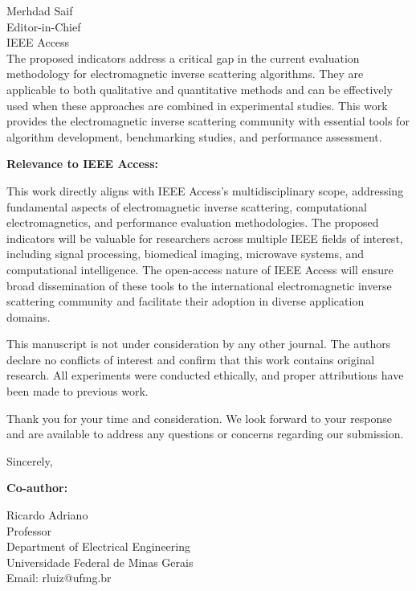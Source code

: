 \documentclass[11pt]{letter}
\begin{document}
\begin{letter}{
Merhdad Saif\\
Editor-in-Chief\\
IEEE Access\\
}
The proposed indicators address a critical gap in the current evaluation methodology for electromagnetic inverse scattering algorithms. They are applicable to both qualitative and quantitative methods and can be effectively used when these approaches are combined in experimental studies. This work provides the electromagnetic inverse scattering community with essential tools for algorithm development, benchmarking studies, and performance assessment.


\textbf{Relevance to IEEE Access:}

This work directly aligns with IEEE Access's multidisciplinary scope, addressing fundamental aspects of electromagnetic inverse scattering, computational electromagnetics, and performance evaluation methodologies. The proposed indicators will be valuable for researchers across multiple IEEE fields of interest, including signal processing, biomedical imaging, microwave systems, and computational intelligence. The open-access nature of IEEE Access will ensure broad dissemination of these tools to the international electromagnetic inverse scattering community and facilitate their adoption in diverse application domains.

This manuscript is not under consideration by any other journal. The authors declare no conflicts of interest and confirm that this work contains original research. All experiments were conducted ethically, and proper attributions have been made to previous work.

Thank you for your time and consideration. We look forward to your response and are available to address any questions or concerns regarding our submission.

\closing{Sincerely,}

\vspace{1cm}

\noindent
\textbf{Co-author:}

\vspace{0.5cm}

\noindent
Ricardo Adriano\\
Professor\\
Department of Electrical Engineering\\
Universidade Federal de Minas Gerais\\
Email: rluiz@ufmg.br

\end{letter}
\end{document}
